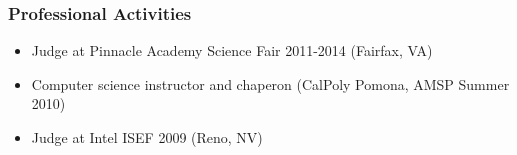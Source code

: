 \documentclass[11pt, letter]{article}
\begin{document}
\begin{raggedright}
\subsubsection{Professional Activities}\label{professional-activities}

\begin{itemize}
\itemsep1pt\parskip0pt
\item
  Judge at Pinnacle Academy Science Fair 2011-2014 (Fairfax, VA)
\item
  Computer science instructor and chaperon (CalPoly Pomona, AMSP Summer
  2010)
\item
  Judge at Intel ISEF 2009 (Reno, NV)
\end{itemize}


\end{raggedright}
\end{document}
